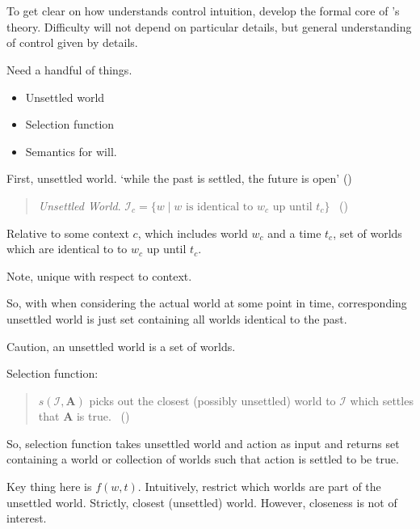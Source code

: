 \section{\citeauthor{Boylan:2020aa}}

\begin{note}
  To get clear on how \citeauthor{Boylan:2020aa} understands control intuition, develop the formal core of \citeauthor{Boylan:2020aa}'s theory.
  Difficulty will not depend on particular details, but general understanding of control given by details.

  Need a handful of things.
  \begin{itemize}
  \item
    Unsettled world
  \item
    Selection function
  \item
    Semantics for will.
  \end{itemize}

  First, unsettled world.
  `while the past is settled, the future is open' (\citeyear[1]{Boylan:2020aa})

  \begin{quote}
    \emph{Unsettled World}. \(\mathcal{I}_{c} = \{w \mid w\text{ is identical to }w_{c}\text{ up until }t_{c}\}\)%
    \mbox{ }\hfill\mbox{(\citeyear[11]{Boylan:2020aa})}
  \end{quote}
  Relative to some context \(c\), which includes world \(w_{c}\) and a time \(t_{c}\), set of worlds which are identical to to \(w_{c}\) up until \(t_{c}\).

  Note, unique with respect to context.

  So, with when considering the actual world at some point in time, corresponding unsettled world is just set containing all worlds identical to the past.

  Caution, an unsettled world is a set of worlds.

  Selection function:

  \begin{quote}
    \(s(\mathcal{I}, \mathbf{A})\) picks out the closest (possibly unsettled) world to \(\mathcal{I}\) which settles that \(\mathbf{A}\) is true.%
    \mbox{ }\hfill\mbox{(\citeyear[11]{Boylan:2020aa})}
  \end{quote}
  So, selection function takes unsettled world and action as input and returns set containing a world or collection of worlds such that action is settled to be true.

  Key thing here is \(f(w,t)\).
  Intuitively, restrict which worlds are part of the unsettled world.
  Strictly, closest (unsettled) world.
  However, closeness is not of interest.


\end{note}
